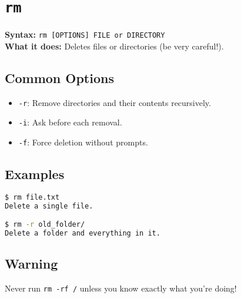 \documentclass[10pt,oneside]{scrbook}
\begin{document}
\section{\texttt{rm}}
\begin{cmdbox}
  \textbf{Syntax:} \lstinline!rm [OPTIONS] FILE or DIRECTORY! \\
  \textbf{What it does:} Deletes files or directories (be very careful!).
\end{cmdbox}
\begin{commanddetails}
  \subsection*{Common Options}
  \begin{itemize}
    \item \lstinline!-r!: Remove directories and their contents recursively.
    \item \lstinline!-i!: Ask before each removal.
    \item \lstinline!-f!: Force deletion without prompts.
  \end{itemize}

  \subsection*{Examples}
  \begin{lstlisting}[language=bash]
$ rm file.txt
Delete a single file.

$ rm -r old_folder/
Delete a folder and everything in it.
  \end{lstlisting}

  \subsection*{Warning}
  Never run \lstinline!rm -rf /! unless you know exactly what you’re doing!
\end{commanddetails}

\end{document}
